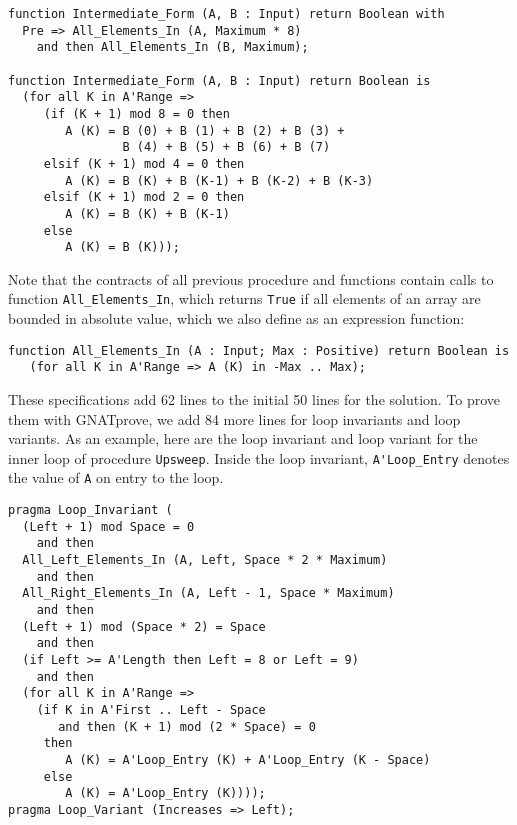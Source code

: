 \documentclass[sttt,draft]{svjour}
\newcommand{\gnatprove}{GNATprove\xspace}
\begin{document}
\begin{footnotesize}
\begin{verbatim}
function Intermediate_Form (A, B : Input) return Boolean with
  Pre => All_Elements_In (A, Maximum * 8)
    and then All_Elements_In (B, Maximum);

function Intermediate_Form (A, B : Input) return Boolean is
  (for all K in A'Range =>
     (if (K + 1) mod 8 = 0 then
        A (K) = B (0) + B (1) + B (2) + B (3) +
                B (4) + B (5) + B (6) + B (7)
     elsif (K + 1) mod 4 = 0 then
        A (K) = B (K) + B (K-1) + B (K-2) + B (K-3)
     elsif (K + 1) mod 2 = 0 then
        A (K) = B (K) + B (K-1)
     else
        A (K) = B (K)));
\end{verbatim}
\end{footnotesize}

Note that the contracts of all previous procedure and functions contain calls
to function \verb|All_Elements_In|, which returns \verb|True| if all elements
of an array are bounded in absolute value, which we also define as an
expression function:

\begin{footnotesize}
\begin{verbatim}
function All_Elements_In (A : Input; Max : Positive) return Boolean is
   (for all K in A'Range => A (K) in -Max .. Max);
\end{verbatim}
\end{footnotesize}

These specifications add 62 lines to the initial 50 lines for the solution. To
prove them with \gnatprove, we add 84 more lines for loop invariants and loop
variants. As an example, here are the loop invariant and loop variant for the
inner loop of procedure \verb|Upsweep|. Inside the loop invariant,
\verb|A'Loop_Entry| denotes the value of \verb|A| on entry to the loop.

\begin{footnotesize}
\begin{verbatim}
pragma Loop_Invariant (
  (Left + 1) mod Space = 0
    and then
  All_Left_Elements_In (A, Left, Space * 2 * Maximum)
    and then
  All_Right_Elements_In (A, Left - 1, Space * Maximum)
    and then
  (Left + 1) mod (Space * 2) = Space
    and then
  (if Left >= A'Length then Left = 8 or Left = 9)
    and then
  (for all K in A'Range =>
    (if K in A'First .. Left - Space
       and then (K + 1) mod (2 * Space) = 0
     then
        A (K) = A'Loop_Entry (K) + A'Loop_Entry (K - Space)
     else
        A (K) = A'Loop_Entry (K))));
pragma Loop_Variant (Increases => Left);
\end{verbatim}
\end{footnotesize}
\end{document}
